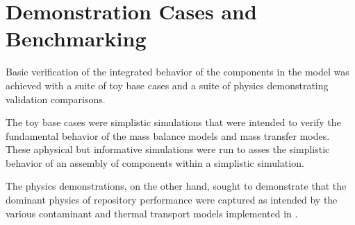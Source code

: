 \chapter{Demonstration Cases and Benchmarking}\label{ch:demonstration}

Basic verification of the integrated behavior of the components in the \Cyder 
model was achieved with a suite of toy base cases and a suite of physics 
demonstrating validation comparisons. 

The toy base cases were simplistic simulations that were intended 
to verify the fundamental behavior of the mass balance models and mass transfer 
modes. These aphysical but informative simulations were run to asses the simplistic 
behavior of an assembly of \Cyder components within a simplistic \Cyclus 
simulation.

The physics demonstrations, on the other hand, sought to demonstrate that the 
dominant physics of repository performance were captured as intended by the 
various contaminant and thermal transport models implemented in \Cyder.




